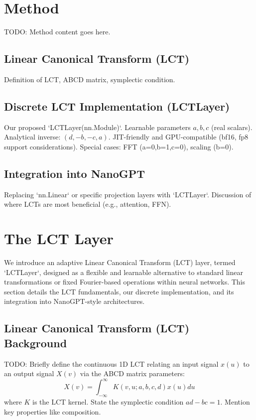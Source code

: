 \section{Method}
TODO: Method content goes here.

\subsection{Linear Canonical Transform (LCT)}
Definition of LCT, ABCD matrix, symplectic condition.

\subsection{Discrete LCT Implementation (LCTLayer)}
Our proposed `LCTLayer(nn.Module)`.
Learnable parameters \(a, b, c\) (real scalars).
Analytical inverse: \((d, -b, -c, a)\).
JIT-friendly and GPU-compatible (bf16, fp8 support considerations).
Special cases: FFT (a=0,b=1,c=0), scaling (b=0).

\subsection{Integration into NanoGPT}
Replacing `nn.Linear` or specific projection layers with `LCTLayer`.
Discussion of where LCTs are most beneficial (e.g., attention, FFN).

\section{The \textsc{LCT} Layer}
\label{sec:method}

We introduce an adaptive Linear Canonical Transform (LCT) layer, termed `LCTLayer`, designed as a flexible and learnable alternative to standard linear transformations or fixed Fourier-based operations within neural networks. This section details the LCT fundamentals, our discrete implementation, and its integration into NanoGPT-style architectures.

\subsection{Linear Canonical Transform (LCT) Background}
TODO: Briefly define the continuous 1D LCT relating an input signal \(x(u)\) to an output signal \(X(v)\) via the ABCD matrix parameters:
\[ X(v) = \int_{-\infty}^{\infty} K(v, u; a, b, c, d) x(u) du \]
where \(K\) is the LCT kernel. State the symplectic condition \(ad - bc = 1\). Mention key properties like composition.

